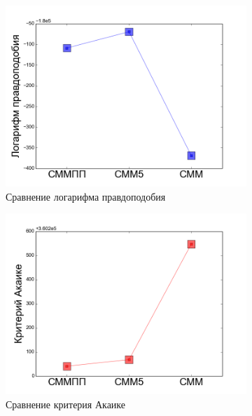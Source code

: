 \documentclass{matmex-diploma-custom}
\begin{document}
\begin{figure}[h!]\centering
\begin{subfigure}[b]{0.32 \textwidth}
	\includegraphics[scale=0.28]{img/real/log_p.png}
	\centering
	\caption{ Сравнение логарифма правдоподобия}
	\label{fig:real_comp_log_p}
\end{subfigure}
\hfill
\begin{subfigure}[b]{0.32 \textwidth}
	\includegraphics[scale=0.28]{img/real/aic.png}
	\centering
	\caption{ Сравнение критерия Акаике }
	\label{fig:real_comp_aic}
\end{subfigure}
\hfill
\begin{subfigure}[b]{0.32 \textwidth}

\end{subfigure}
\end{figure}
\end{document}
